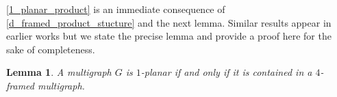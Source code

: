 \documentclass{patmorin}
\theoremstyle{plain}
\newtheorem{thm}{Theorem}
\newtheorem{lem}[thm]{Lemma}
\theoremstyle{definition}
\newcommand{\note}[2]{\noindent{\color{red}[#1:~#2]}}
\begin{document}

%



%
%



\cref{1_planar_product} is an immediate consequence of \cref{d_framed_product_stucture} and the next lemma. Similar results appear in earlier works \cite{CGP06,BDGGMR,Brandenburg19,Brandenburg20} but we state the precise lemma and provide a proof here for the sake of completeness.

\begin{lem}\label{1_planar_is_4_framed}
A multigraph $G$ is $1$-planar if and only if it is contained in a $4$-framed multigraph.
\end{lem}


\end{document}
